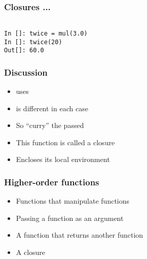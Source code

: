 \documentclass[14pt,compress]{beamer}
\begin{document}
\begin{frame}[fragile]
  \frametitle{Closures ...}
  \begin{lstlisting}

In []: twice = mul(3.0)
In []: twice(20)
Out[]: 60.0
  \end{lstlisting}
\end{frame}

\begin{frame}
  \frametitle{Discussion}
  \begin{itemize}
  \item {} uses 
  \item {} is different in each case
  \item So  ``curry'' the passed 
  \item This function is called a closure
  \item Encloses its local environment
  \end{itemize}
\end{frame}


\begin{frame}[fragile]
  \frametitle{Higher-order functions}
  \begin{itemize}
  \item Functions that manipulate functions
  \item Passing a function as an argument
  \item A function that returns another function
  \item A closure
  \end{itemize}
\end{frame}
\end{document}

